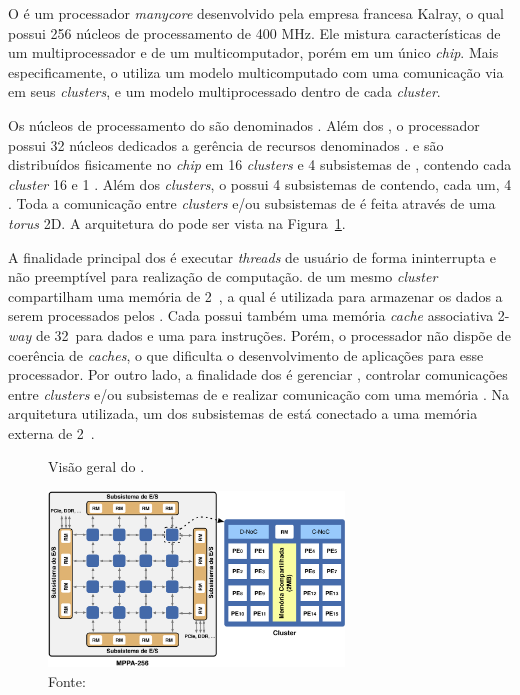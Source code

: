 O \mppa é um processador \textit{manycore} desenvolvido pela empresa francesa
Kalray, o qual possui 256 núcleos de processamento de 400 MHz. Ele mistura características
de um multiprocessador e de um multicomputador, porém em um único \textit{chip}.
Mais especificamente, o \mppa utiliza um modelo multicomputado com uma
comunicação via \noc em seus \textit{clusters}, e um modelo multiprocessado
dentro de cada \textit{cluster}.

Os núcleos de processamento do \mppa são denominados \pes.
Além dos \pes, o processador possui 32 núcleos dedicados a gerência de recursos
denominados  \rmans. \pes e \rmans são distribuídos
fisicamente no \textit{chip} em 16 \textit{clusters} e 4 subsistemas de \es,
contendo cada \textit{cluster} 16 \pes e 1 \rman. Além dos \textit{clusters}, o
\mppa possui 4 subsistemas de \es contendo, cada um, 4 \rmans. Toda a comunicação
entre \textit{clusters} e/ou subsistemas de \es é feita através de uma \noc
\textit{torus} 2D. A arquitetura do \mppa pode ser vista na Figura~\ref{fig:mppa}.

A finalidade principal dos \pes é executar \textit{threads} de usuário de forma
ininterrupta e não preemptível para realização de computação. \pes de um mesmo
\textit{cluster} compartilham uma memória de 2~\mb, a qual é utilizada para
armazenar os dados a serem processados pelos \pes. Cada \pe possui também uma
memória \textit{cache} associativa 2-\textit{way} de 32~\kb para dados e uma para
instruções. Porém, o processador não dispõe de coerência de \textit{caches}, o
que dificulta o desenvolvimento de aplicações para esse processador. Por outro
lado, a finalidade dos \rmans é gerenciar \es, controlar comunicações entre
\textit{clusters} e/ou subsistemas de \es e realizar comunicação com uma memória
\ram. Na arquitetura utilizada, um dos subsistemas de \es está conectado a uma
memória externa \lpddr de 2~\gb.

\begin{figure}
	\centering
	\caption{Visão geral do \mppa.}
	\includegraphics[width=0.7\textwidth]{figs/mppa-overall.pdf}
    \caption*{Fonte: ~\cite{Castro-IA3:2013}}
	\label{fig:mppa}
\end{figure}

